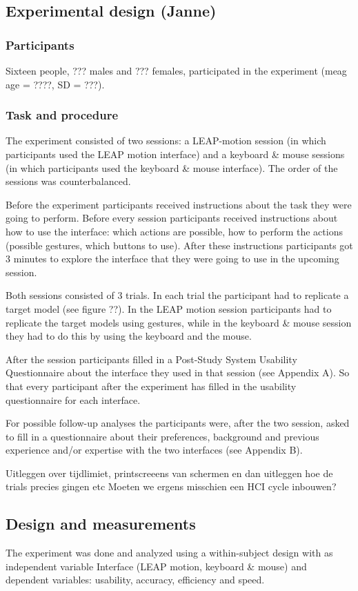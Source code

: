 \subsection{Experimental design (Janne)}
\subsubsection{Participants}
Sixteen people, ??? males and ??? females, participated in the experiment (meag age = ????, SD = ???). 
\subsubsection{Task and procedure}
The experiment consisted of two sessions: a LEAP-motion session (in which participants used the LEAP motion interface) and a keyboard \& mouse sessions (in which participants used the keyboard \& mouse interface). The order of the sessions was counterbalanced.

Before the experiment participants received instructions about the task they were going to perform. Before every session participants received instructions about how to use the interface: which actions are possible, how to perform the actions (possible gestures, which buttons to use). After these instructions participants got 3 minutes to explore the interface that they were going to use in the upcoming session. 

Both sessions consisted of 3 trials. In each trial the participant had to replicate a target model (see figure ??).  In the LEAP motion session participants had to replicate the target models using gestures, while in the keyboard \& mouse session they had to do this by using the keyboard and the mouse.

After the session participants filled in a Post-Study System Usability Questionnaire about the interface they used in that session (see Appendix A). So that every participant after the experiment has filled in the usability questionnaire for each interface.

For possible follow-up analyses the participants were, after the two session, asked to fill in a questionnaire about their preferences, background and previous experience and/or expertise with the two interfaces (see Appendix B).

Uitleggen over tijdlimiet, printscreeens van schermen en dan uitleggen hoe de trials precies gingen etc
Moeten we ergens misschien een HCI cycle inbouwen?

\subsection{Design and measurements}
The experiment was done and analyzed using a within-subject design with as independent variable Interface (LEAP motion, keyboard \& mouse) and dependent variables: usability, accuracy, efficiency and speed. 

